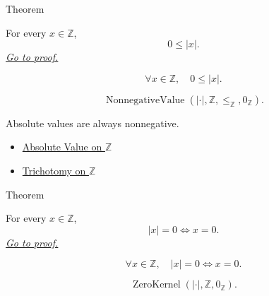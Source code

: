 \begin{theorembox}{Theorem}
\begin{theorem}
\label{thm:absolute-value-nonnegative-on-z}
For every $x\in\mathbb{Z}$,
\[
0\le |x|.
\]
\hyperref[prf:absolute-value-nonnegative-on-z]{\textit{Go to proof.}}
\end{theorem}
\end{theorembox}

\begin{remark*}
\[
\forall x\in\mathbb{Z},\quad 0\le |x|.
\]
\end{remark*}

\begin{remark*}
\[
\operatorname{NonnegativeValue}(|\cdot|,\mathbb{Z},\le_{\mathbb{Z}},0_{\mathbb{Z}}).
\]
\end{remark*}

\begin{remark*}[Interpretation]
Absolute values are always nonnegative.
\end{remark*}

\begin{dependencies}
\begin{itemize}
  \item \hyperref[def:absolute-value-on-z]{Absolute Value on $\mathbb{Z}$}
  \item \hyperref[thm:trichotomy-on-z]{Trichotomy on $\mathbb{Z}$}
\end{itemize}
\end{dependencies}

\begin{theorembox}{Theorem}
\begin{theorem}
\label{thm:absolute-value-zero-iff-on-z}
For every $x\in\mathbb{Z}$,
\[
|x|=0 \Longleftrightarrow x=0.
\]
\hyperref[prf:absolute-value-zero-iff-on-z]{\textit{Go to proof.}}
\end{theorem}
\end{theorembox}

\begin{remark*}
\[
\forall x\in\mathbb{Z},\quad |x|=0 \Longleftrightarrow x=0.
\]
\end{remark*}

\begin{remark*}
\[
\operatorname{ZeroKernel}(|\cdot|,\mathbb{Z},0_{\mathbb{Z}}).
\]
\end{remark*}

